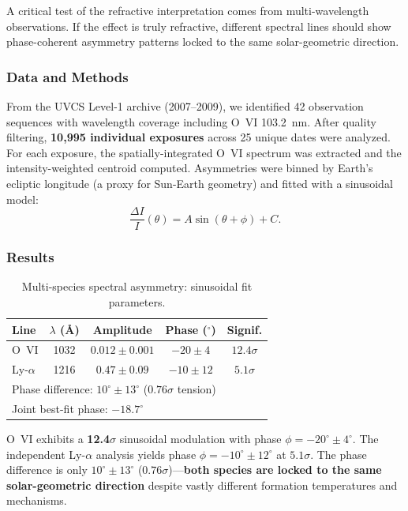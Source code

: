 A critical test of the refractive interpretation comes from multi-wavelength 
observations. If the effect is truly refractive, different spectral lines should 
show phase-coherent asymmetry patterns locked to the same solar-geometric direction.

\subsubsection{Data and Methods}

From the UVCS Level-1 archive (2007--2009), we identified 42 observation sequences 
with wavelength coverage including O~VI 103.2~nm. After quality filtering, 
\textbf{10,995 individual exposures} across 25 unique dates were analyzed. For 
each exposure, the spatially-integrated O~VI spectrum was extracted and the 
intensity-weighted centroid computed. Asymmetries were binned by Earth's ecliptic 
longitude (a proxy for Sun-Earth geometry) and fitted with a sinusoidal model:
\begin{equation}
\frac{\Delta I}{I}(\theta) = A \sin(\theta + \phi) + C.
\end{equation}

\subsubsection{Results}

\begin{table}[h]
\caption{Multi-species spectral asymmetry: sinusoidal fit parameters.}
\label{tab:ovi-lya-comparison}
\begin{ruledtabular}
\begin{tabular}{lcccc}
Line & $\lambda$ (\AA) & Amplitude & Phase ($^\circ$) & Signif. \\
\hline
O~VI & 1032 & $0.012 \pm 0.001$ & $-20 \pm 4$ & $12.4\sigma$ \\
Ly-$\alpha$ & 1216 & $0.47 \pm 0.09$ & $-10 \pm 12$ & $5.1\sigma$ \\[3pt]
\multicolumn{5}{l}{Phase difference: $10^\circ \pm 13^\circ$ ($0.76\sigma$ tension)} \\
\multicolumn{5}{l}{Joint best-fit phase: $-18.7^\circ$} \\
\end{tabular}
\end{ruledtabular}
\end{table}

O~VI exhibits a \textbf{12.4$\sigma$} sinusoidal modulation with phase 
$\phi = -20^\circ \pm 4^\circ$. The independent Ly-$\alpha$ analysis yields 
phase $\phi = -10^\circ \pm 12^\circ$ at $5.1\sigma$. The phase difference is 
only $10^\circ \pm 13^\circ$ ($0.76\sigma$)---\textbf{both species are locked to 
the same solar-geometric direction} despite vastly different formation temperatures 
and mechanisms.

